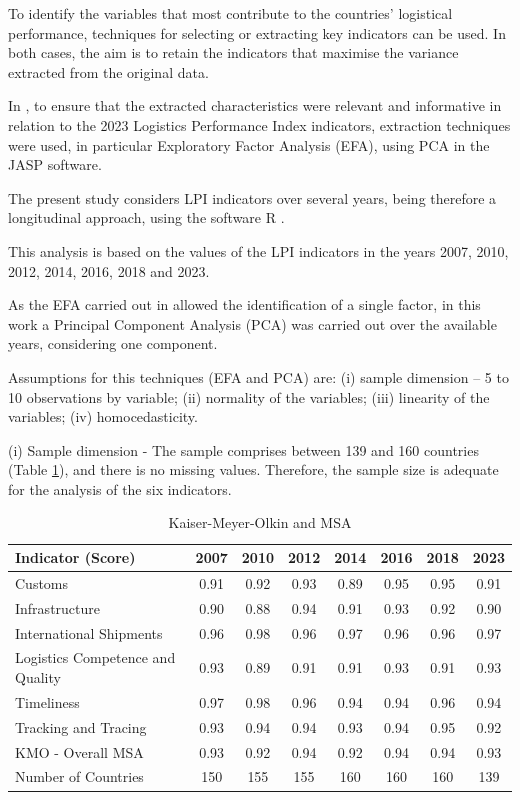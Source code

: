 \documentclass[conference]{IEEEtran}
\begin{document}
To identify the variables that most contribute  to the countries' logistical performance, techniques for selecting or extracting key indicators can be used. In both cases, the aim is to retain the indicators that maximise the variance extracted from the original data.

In \cite{correiaICIE}, to ensure that the extracted characteristics were relevant and informative in relation to the 2023 Logistics Performance Index indicators, extraction techniques were used, in particular Exploratory Factor Analysis (EFA), using PCA in the JASP \cite{JASP} software.

The present study considers LPI indicators over several years, being therefore a longitudinal approach, using the software R \cite{R}.

This analysis is based on the values of the LPI \cite{lpi_worldbank_2023} indicators in the years 2007, 2010, 2012, 2014, 2016, 2018 and 2023.

As the EFA carried out in \cite{correiaICIE} allowed the identification of a single factor, in this work a Principal Component Analysis (PCA) was carried out over the available years, considering one component.

Assumptions for this techniques (EFA and PCA)  are: (i) sample dimension -- 5 to 10 observations by variable; (ii) normality of the variables; (iii) linearity of the variables; (iv) homocedasticity.

(i) Sample dimension - The sample comprises between 139 and 160 countries (Table \ref{tab:kmo}), and there is no missing values. Therefore, the sample size is adequate for the analysis of the six indicators.

\begin{table}[h]
  \caption{Kaiser-Meyer-Olkin and MSA}
  \label{tab:kmo}
\begin{tabular}{lccccccc}
\toprule
\textbf{Indicator (Score)}	&	\textbf{2007}	&	\textbf{2010}	&	\textbf{2012}	&	\textbf{2014}	&	\textbf{2016}	&	\textbf{2018}	&	\textbf{2023}	\\  
\midrule
Customs	&	0.91	&	0.92	&	0.93	&	0.89	&	0.95	&	0.95	&	0.91	\\	
Infrastructure	&	0.90	&	0.88	&	0.94	&	0.91	&	0.93	&	0.92	&	0.90	\\	 
International Shipments	&	0.96	&	0.98	&	0.96	&	0.97	&	0.96	&	0.96	&	0.97	\\	 
Logistics Competence and Quality	&	0.93	&	0.89	&	0.91	&	0.91	&	0.93	&	0.91	&	0.93	\\	 
Timeliness	&	0.97	&	0.98	&	0.96	&	0.94	&	0.94	&	0.96	&	0.94	\\	 
Tracking and Tracing	&	0.93	&	0.94	&	0.94	&	0.93	&	0.94	&	0.95	&	0.92	\\	 
\midrule
KMO - Overall MSA	&	0.93	&	0.92	&	0.94	&	0.92	&	0.94	&	0.94	&	0.93	\\	 
\midrule
Number of Countries	&	150	&	155	&	155	&	160	&	160	&	160	&	139\\	
\bottomrule
\end{tabular}
\end{table}
\end{document}

